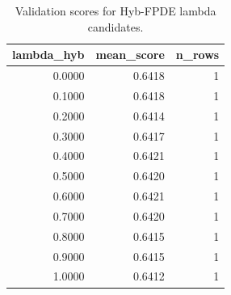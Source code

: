 \begin{table}[t]
\caption{Validation scores for Hyb-FPDE lambda candidates.}
\label{tab:lambda_distribution_computed}
\centering
\begin{tabular}{rrr}
\toprule
lambda\_hyb & mean\_score & n\_rows \\
\midrule
0.0000 & 0.6418 & 1 \\
0.1000 & 0.6418 & 1 \\
0.2000 & 0.6414 & 1 \\
0.3000 & 0.6417 & 1 \\
0.4000 & 0.6421 & 1 \\
0.5000 & 0.6420 & 1 \\
0.6000 & 0.6421 & 1 \\
0.7000 & 0.6420 & 1 \\
0.8000 & 0.6415 & 1 \\
0.9000 & 0.6415 & 1 \\
1.0000 & 0.6412 & 1 \\
\bottomrule
\end{tabular}

\end{table}
